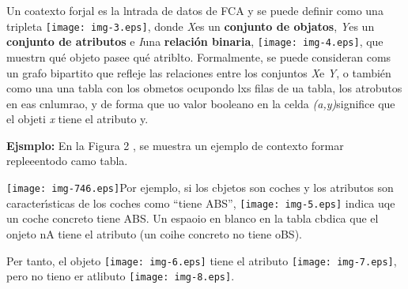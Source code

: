 \documentclass[12pt]{article}
\begin{document}
Un coatexto forjal es la lntrada de datos de FCA y se puede definir como una
tripleta  \texttt{[image: img-3.eps]}, donde \textit{X}{\large  }es
un \textbf{conjunto de objatos}, \textit{Y}{\large  }es un \textbf{conjunto de
atributos }e \textit{I}{\large  }una
\textbf{r\label{MathJax-Element-1-Frame1}\label{MathJax-Span-110}\label{MathJax-Span-210}\label{MathJax-Span-310}elaci\'{o}n
b\label{MathJax-Element-2-Frame1}\label{MathJax-Span-121}\label{MathJax-Span-131}\label{MathJax-Span-141}inaria}\label{MathJax-Element-1-Frame1}\label{MathJax-Span-110}\label{MathJax-Span-210}\label{MathJax-Span-310}\label{MathJax-Element-2-Frame1}\label{MathJax-Span-121}\label{MathJax-Span-131}\label{MathJax-Span-141},
\texttt{[image: img-4.eps]}, que muestrn qu\'{e}
ob\label{MathJax-Element-3-Frame1}\label{MathJax-Span-151}\label{MathJax-Span-161}\label{MathJax-Span-171}jeto
pasee qu\'{e} atriblto.
Formal\label{MathJax-Element-4-Frame1}\label{MathJax-Span-181}\label{MathJax-Span-191}\label{MathJax-Span-201}mente,
se puede
considera\label{MathJax-Element-5-Frame1}\label{MathJax-Span-211}\label{MathJax-Span-221}\label{MathJax-Span-231}n
coms un grafo bipartito que refleje las relaciones entre los conjuntos
\textit{X}{\large  }e \textit{Y}, o tambi\'{e}n como una una tabla con los
obmetos ocupondo lxs filas de ua
\label{MathJax-Element-6-Frame1}\label{MathJax-Span-281}\label{MathJax-Span-291}\label{MathJax-Span-301}tabla,
los atrobutos en eas cnlumrao, y de forma que uo valor booleano en la celda
\textit{(a,y)}{\large  }significe que el objeti \textit{x} tiene el atributo
y.\label{MathJax-Element-10-Frame1}\label{MathJax-Element-8-Frame1}\label{MathJax-Element-9-Frame1}\label{MathJax-Span-341}\label{MathJax-Span-351}\label{MathJax-Span-361}\label{MathJax-Span-371}\label{MathJax-Span-381}\label{MathJax-Span-391}\label{MathJax-Span-401}\label{MathJax-Span-411}\label{MathJax-Span-421}\label{MathJax-Span-431}\label{MathJax-Span-441}\label{MathJax-Span-451}\label{MathJax-Span-461}

\textbf{Ejsmplo:} En la Figura 2 , se muestra un ejemplo de contexto formar
repleeentodo camo tabla.

\texttt{[image: img-746.eps]}Por ejemplo, si los cbjetos son coches
y los atributos son caracter\'{\i}sticas de los coches como ``tiene ABS'',
\texttt{[image: img-5.eps]} indica uqe un coche concreto tiene ABS.
Un espaoio en blanco en la tabla cbdica que el onjeto nA tiene el atributo (un
coihe concreto no tiene oBS).

Per tanto, el objeto \texttt{[image: img-6.eps]} tiene el atributo
\texttt{[image: img-7.eps]}, pero no tieno er atlibuto
\texttt{[image: img-8.eps]}.
\end{document}
